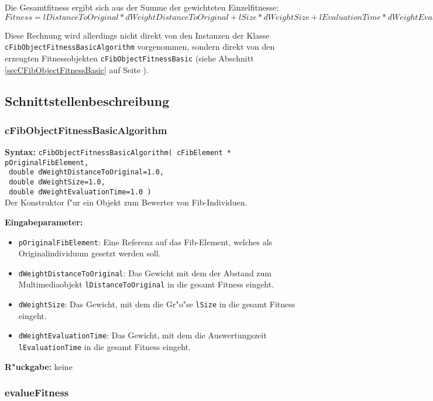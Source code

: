 Die Gesamtfitness ergibt sich aus der Summe der gewichteten Einzelfitnesse: $Fitness=lDistanceToOriginal*dWeightDistanceToOriginal+lSize*dWeightSize+lEvaluationTime*dWeightEvaluationTime$

Diese Rechnung wird allerdings nicht direkt von den Instanzen der Klasse \verb|cFibObjectFitnessBasicAlgorithm| vorgenommen, sondern direkt von den erzeugten Fitnessobjekten \verb|cFibObjectFitnessBasic| (siehe Abschnitt \ref{secCFibObjectFitnessBasic} auf Seite \pageref{secCFibObjectFitnessBasic}).


\subsection{Schnittstellenbeschreibung}

\subsubsection{cFibObjectFitnessBasicAlgorithm}

\textbf{Syntax:} \verb|cFibObjectFitnessBasicAlgorithm( cFibElement * pOriginalFibElement, | \\\verb| double dWeightDistanceToOriginal=1.0, | \\\verb| double dWeightSize=1.0, | \\\verb| double dWeightEvaluationTime=1.0 )| \\

Der Konstruktor f"ur ein Objekt zum Bewerter von Fib-Individuen.

\bigskip\noindent
\textbf{Eingabeparameter:}
\begin{itemize}
 \item \verb|pOriginalFibElement|: Eine Referenz auf das Fib-Element, welches als Originalindividuum gesetzt werden soll.
 \item \verb|dWeightDistanceToOriginal|: Das Gewicht mit dem der Abstand zum Multimediaobjekt \verb|lDistanceToOriginal| in die gesamt Fitness eingeht.
 \item \verb|dWeightSize|: Das Gewicht, mit dem die Gr"o"se \verb|lSize| in die gesamt Fitness eingeht.
 \item \verb|dWeightEvaluationTime|: Das Gewicht, mit dem die Auswertungszeit \verb|lEvaluationTime| in die gesamt Fitness eingeht.
\end{itemize}

\bigskip\noindent
\textbf{R"uckgabe:} keine


\subsubsection{evalueFitness}

